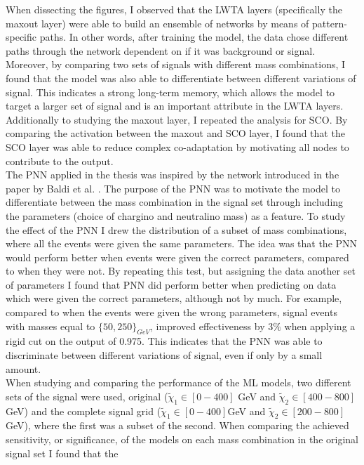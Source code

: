 When dissecting the figures, I observed that the \ac{LWTA} layers (specifically the maxout layer) were able to build an ensemble of networks by means of pattern-specific paths. In other words, after training 
the model, the data chose different paths through the network dependent on if it was background or signal. Moreover, by comparing two sets of signals with different mass combinations, I found that the model 
was also able to differentiate between different variations of signal. This indicates a strong long-term memory, which allows the model to target a larger set of signal and is an important attribute
in the \ac{LWTA} layers. Additionally to studying the maxout layer, I repeated the analysis for \ac{SCO}. By comparing the activation between the maxout and \ac{SCO} layer, I found that the \ac{SCO} layer 
was able to reduce complex co-adaptation by motivating all nodes to contribute to the output.
\\\newline
The \ac{PNN} applied in the thesis was inspired by the network introduced in the paper by Baldi et al. \cite{PNN}. The purpose of the \ac{PNN} was to motivate the model to differentiate between the mass combination 
in the signal set through including the parameters (choice of chargino and neutralino mass) as a feature. To study the effect of the \ac{PNN} I drew the distribution of a subset of mass combinations, where all the events were given the same parameters.
The idea was that the \ac{PNN} would perform better when events were given the correct parameters, compared to when they were not. By repeating this test, but assigning the data another set of parameters I found that \ac{PNN} did 
perform better when predicting on data which were given the correct parameters, although not by much. For example, compared to when the events were given the wrong parameters, signal events with masses equal to $\{50,250\}_{GeV}$, 
improved effectiveness by $3\%$ when applying a rigid cut on the output of 0.975. This indicates that the \ac{PNN} was able to discriminate between different variations of signal, even if only by 
a small amount.
\\\newline
When studying and comparing the performance of the \ac{ML} models, two different sets of the signal were used, original ($\tilde{\chi}_1\in[0-400]$ GeV and  $\tilde{\chi}_2\in[400-800]$ GeV) and the complete signal grid ($\tilde{\chi}_1\in[0-400]$GeV 
and $\tilde{\chi}_2\in[200-800]$GeV), where the first was a subset of the second. When comparing the achieved sensitivity, or significance, of the models on each mass combination in the original signal set I found that the 
